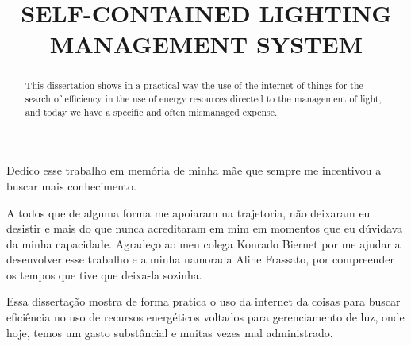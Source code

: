 \documentclass[openright]{normas-utf-tex} %
\title{\MakeUppercase{Self-contained lighting management system}} %
\begin{document}
\capa %
\folhaderosto %

\fichacatpgbib{\pageref{bibstart}-\pageref{bibend}}
\fichacat



\begin{dedicatoria}
Dedico esse trabalho em memória de minha mãe que sempre me incentivou a buscar mais conhecimento.
\end{dedicatoria}

\begin{agradecimentos}
A todos que de alguma forma me apoiaram na trajetoria, não deixaram eu desistir e mais do que nunca acreditaram em mim em momentos que eu dúvidava da minha capacidade.
Agradeço ao meu colega Konrado Biernet por me ajudar a desenvolver esse trabalho e a minha namorada Aline Frassato, por compreender os tempos que tive que deixa-la sozinha.
\end{agradecimentos}

\begin{resumo}
Essa dissertação mostra de forma pratica o uso da internet da coisas para buscar eficiência no uso de recursos energéticos voltados para gerenciamento de luz, onde hoje, temos um gasto substâncial e muitas vezes mal administrado.
\end{resumo}

\begin{abstract}
This dissertation shows in a practical way the use of the internet of things for the search of efficiency in the use of energy resources directed to the management of light, and today we have a specific and often mismanaged expense.
\end{abstract}

\listadefiguras %


\sumario %
\end{document}
